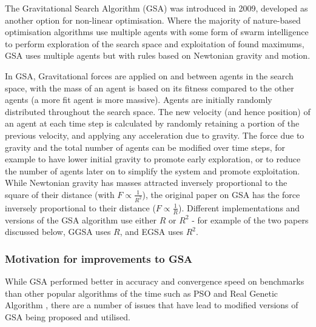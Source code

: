 The Gravitational Search Algorithm (GSA) \cite{GSA} was introduced in 2009, developed as another option for non-linear optimisation.
Where the majority of nature-based optimisation algorithms use multiple agents with some form of swarm intelligence to perform exploration of the search space and exploitation of found maximums, GSA uses multiple agents but with rules based on Newtonian gravity and motion.

In GSA, Gravitational forces are applied on and between agents in the search space, with the mass of an agent is based on its fitness compared to the other agents (a more fit agent is more massive).
Agents are initially randomly distributed throughout the search space.
The new velocity (and hence position) of an agent at each time step is calculated by randomly retaining a portion of the previous velocity, and applying any acceleration due to gravity.
The force due to gravity and the total number of agents can be modified over time steps, for example to have lower initial gravity to promote early exploration, or to reduce the number of agents later on to simplify the system and promote exploitation.
While Newtonian gravity has masses attracted inversely proportional to the square of their distance (with $F \propto \frac{1}{R^2}$), the original paper on GSA has the force inversely proportional to their distance ($F \propto \frac{1}{R}$).
Different implementations and versions of the GSA algorithm use either $R$ or $R^2$ - for example of the two papers discussed below, GGSA uses $R$, and EGSA uses $R^2$.


\subsubsection{Motivation for improvements to GSA}\label{sec:alg:gsa:motiviation}
While GSA performed better in accuracy and convergence speed on benchmarks than other popular algorithms of the time such as PSO and Real Genetic Algorithm \cite{GSA}, there are a number of issues that have lead to modified versions of GSA being proposed and utilised.

